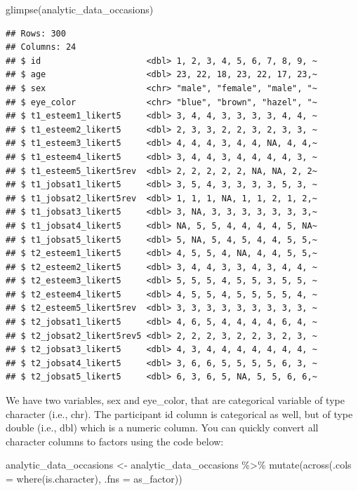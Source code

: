 \documentclass[
]{krantz}
\makeatletter
\newenvironment{Shaded}{\begin{snugshade}}{\end{snugshade}}
\newcommand{\AttributeTok}[1]{\textcolor[rgb]{0.61,0.61,0.61}{#1}}
\newcommand{\FunctionTok}[1]{\textcolor[rgb]{0,0,0}{#1}}
\newcommand{\NormalTok}[1]{#1}
\newcommand{\OtherTok}[1]{\textcolor[rgb]{0.37,0.37,0.37}{#1}}
\newcommand{\SpecialCharTok}[1]{\textcolor[rgb]{0,0,0}{#1}}
\newenvironment{kframe}{%
\medskip{}
\setlength{\fboxsep}{.8em}
 \def\at@end@of@kframe{}%
 \ifinner\ifhmode%
  \def\at@end@of@kframe{\end{minipage}}%
  \begin{minipage}{\columnwidth}%
 \fi\fi%
 \def\FrameCommand##1{\hskip\@totalleftmargin \hskip-\fboxsep
 \colorbox{shadecolor}{##1}\hskip-\fboxsep
     \hskip-\linewidth \hskip-\@totalleftmargin \hskip\columnwidth}%
 \MakeFramed {\advance\hsize-\width
   \@totalleftmargin\z@ \linewidth\hsize
   \@setminipage}}%
 {\par\unskip\endMakeFramed%
 \at@end@of@kframe}
\renewenvironment{Shaded}{\begin{kframe}}{\end{kframe}}
\makeatother
\begin{document}
\begin{Shaded}
\begin{Highlighting}[]
\FunctionTok{glimpse}\NormalTok{(analytic\_data\_occasions)}
\end{Highlighting}
\end{Shaded}

\begin{verbatim}
## Rows: 300
## Columns: 24
## $ id                     <dbl> 1, 2, 3, 4, 5, 6, 7, 8, 9, ~
## $ age                    <dbl> 23, 22, 18, 23, 22, 17, 23,~
## $ sex                    <chr> "male", "female", "male", "~
## $ eye_color              <chr> "blue", "brown", "hazel", "~
## $ t1_esteem1_likert5     <dbl> 3, 4, 4, 3, 3, 3, 3, 4, 4, ~
## $ t1_esteem2_likert5     <dbl> 2, 3, 3, 2, 2, 3, 2, 3, 3, ~
## $ t1_esteem3_likert5     <dbl> 4, 4, 4, 3, 4, 4, NA, 4, 4,~
## $ t1_esteem4_likert5     <dbl> 3, 4, 4, 3, 4, 4, 4, 4, 3, ~
## $ t1_esteem5_likert5rev  <dbl> 2, 2, 2, 2, 2, NA, NA, 2, 2~
## $ t1_jobsat1_likert5     <dbl> 3, 5, 4, 3, 3, 3, 3, 5, 3, ~
## $ t1_jobsat2_likert5rev  <dbl> 1, 1, 1, NA, 1, 1, 2, 1, 2,~
## $ t1_jobsat3_likert5     <dbl> 3, NA, 3, 3, 3, 3, 3, 3, 3,~
## $ t1_jobsat4_likert5     <dbl> NA, 5, 5, 4, 4, 4, 4, 5, NA~
## $ t1_jobsat5_likert5     <dbl> 5, NA, 5, 4, 5, 4, 4, 5, 5,~
## $ t2_esteem1_likert5     <dbl> 4, 5, 5, 4, NA, 4, 4, 5, 5,~
## $ t2_esteem2_likert5     <dbl> 3, 4, 4, 3, 3, 4, 3, 4, 4, ~
## $ t2_esteem3_likert5     <dbl> 5, 5, 5, 4, 5, 5, 3, 5, 5, ~
## $ t2_esteem4_likert5     <dbl> 4, 5, 5, 4, 5, 5, 5, 5, 4, ~
## $ t2_esteem5_likert5rev  <dbl> 3, 3, 3, 3, 3, 3, 3, 3, 3, ~
## $ t2_jobsat1_likert5     <dbl> 4, 6, 5, 4, 4, 4, 4, 6, 4, ~
## $ t2_jobsat2_likert5rev5 <dbl> 2, 2, 2, 3, 2, 2, 3, 2, 3, ~
## $ t2_jobsat3_likert5     <dbl> 4, 3, 4, 4, 4, 4, 4, 4, 4, ~
## $ t2_jobsat4_likert5     <dbl> 3, 6, 6, 5, 5, 5, 5, 6, 3, ~
## $ t2_jobsat5_likert5     <dbl> 6, 3, 6, 5, NA, 5, 5, 6, 6,~
\end{verbatim}

We have two variables, sex and eye\_color, that are categorical variable of type character (i.e., chr). The participant id column is categorical as well, but of type double (i.e., dbl) which is a numeric column. You can quickly convert all character columns to factors using the code below:

\begin{Shaded}
\begin{Highlighting}[]
\NormalTok{analytic\_data\_occasions }\OtherTok{\textless{}{-}}\NormalTok{ analytic\_data\_occasions }\SpecialCharTok{\%\textgreater{}\%}
  \FunctionTok{mutate}\NormalTok{(}\FunctionTok{across}\NormalTok{(}\AttributeTok{.cols =} \FunctionTok{where}\NormalTok{(is.character),}
                \AttributeTok{.fns =}\NormalTok{ as\_factor))}
\end{Highlighting}
\end{Shaded}
\end{document}
